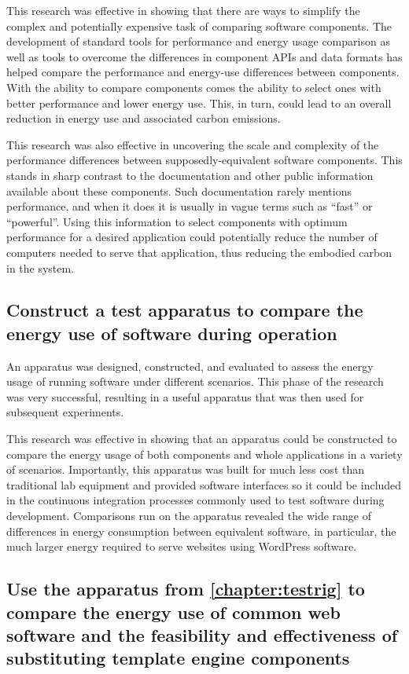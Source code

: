 This research was effective in showing that there are ways to simplify the complex and potentially expensive task of comparing software components. The development of standard tools for performance and energy usage comparison as well as tools to overcome the differences in component APIs and data formats has helped compare the performance and energy-use differences between components. With the ability to compare components comes the ability to select ones with better performance and lower energy use. This, in turn, could lead to an overall reduction in energy use and associated carbon emissions.

This research was also effective in uncovering the scale and complexity of the performance differences between supposedly-equivalent software components. This stands in sharp contrast to the documentation and other public information available about these components. Such documentation rarely mentions performance, and when it does it is usually in vague terms such as \enquote{fast} or \enquote{powerful}. Using this information to select components with optimum performance for a desired application could potentially reduce the number of computers needed to serve that application, thus reducing the embodied carbon in the system.


\subsection{Construct a test apparatus to compare the energy use of software during operation}

An apparatus was designed, constructed, and evaluated to assess the energy usage of running software under different scenarios. This phase of the research was very successful, resulting in a useful apparatus that was then used for subsequent experiments.

This research was effective in showing that an apparatus could be constructed to compare the energy usage of both components and whole applications in a variety of scenarios. Importantly, this apparatus was built for much less cost than traditional lab equipment and provided software interfaces so it could be included in the \gls{continuous integration} processes commonly used to test software during development. Comparisons run on the apparatus revealed the wide range of differences in energy consumption between equivalent software, in particular, the much larger energy required to serve websites using WordPress software.


\subsection{Use the apparatus from \autoref{chapter:testrig} to compare the energy use of common
web software and the feasibility and effectiveness of substituting template engine components}

